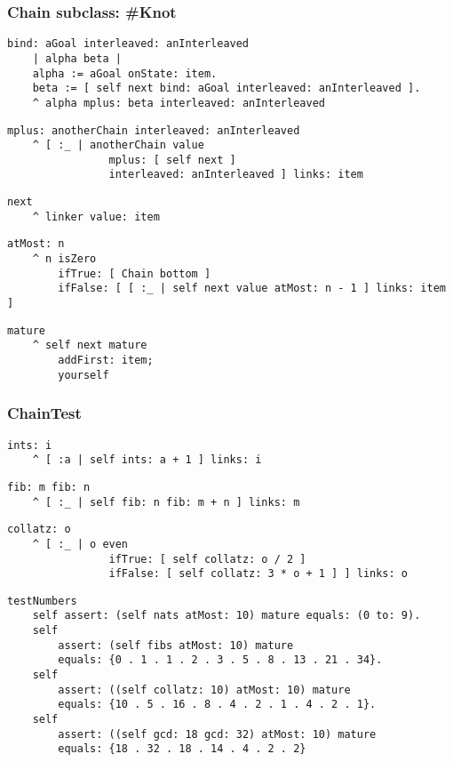 \documentclass{beamer}
\begin{document}
\begin{frame}[fragile]
\frametitle{Chain subclass: \#Knot}
\begin{verbatim}
bind: aGoal interleaved: anInterleaved
    | alpha beta |
    alpha := aGoal onState: item.
    beta := [ self next bind: aGoal interleaved: anInterleaved ].
    ^ alpha mplus: beta interleaved: anInterleaved
\end{verbatim}
\begin{verbatim}
mplus: anotherChain interleaved: anInterleaved
    ^ [ :_ | anotherChain value 
                mplus: [ self next ] 
                interleaved: anInterleaved ] links: item
\end{verbatim}
\begin{verbatim}
next
    ^ linker value: item
\end{verbatim}
\begin{verbatim}
atMost: n
    ^ n isZero
        ifTrue: [ Chain bottom ]
        ifFalse: [ [ :_ | self next value atMost: n - 1 ] links: item ]
\end{verbatim}
\begin{verbatim}
mature
    ^ self next mature
        addFirst: item;
        yourself
\end{verbatim}
\end{frame}

\begin{frame}[fragile]
\frametitle{ChainTest}
\begin{verbatim}
ints: i
    ^ [ :a | self ints: a + 1 ] links: i
\end{verbatim}
\begin{verbatim}
fib: m fib: n
    ^ [ :_ | self fib: n fib: m + n ] links: m
\end{verbatim}
\begin{verbatim}
collatz: o
    ^ [ :_ | o even
                ifTrue: [ self collatz: o / 2 ]
                ifFalse: [ self collatz: 3 * o + 1 ] ] links: o
\end{verbatim}
\begin{verbatim}
testNumbers
    self assert: (self nats atMost: 10) mature equals: (0 to: 9).
    self
        assert: (self fibs atMost: 10) mature
        equals: {0 . 1 . 1 . 2 . 3 . 5 . 8 . 13 . 21 . 34}.
    self
        assert: ((self collatz: 10) atMost: 10) mature
        equals: {10 . 5 . 16 . 8 . 4 . 2 . 1 . 4 . 2 . 1}.
    self
        assert: ((self gcd: 18 gcd: 32) atMost: 10) mature
        equals: {18 . 32 . 18 . 14 . 4 . 2 . 2}
\end{verbatim}
\end{frame}
\end{document}
